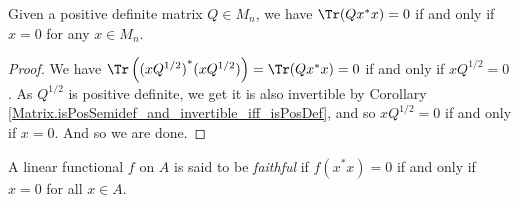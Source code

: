 \begin{lemma}\label{PosDef.trace_conjTranspose_mul_self_eq_zero_iff}\leanok
  Given a positive definite matrix $Q\in{M_n}$, we have $\Tr(Qx^*x)=0$ if and only if $x=0$ for any $x\in{M_n}$.
 \end{lemma}
 \begin{proof}\leanok
  We have $\Tr\left({(xQ^{1/2})}^*(xQ^{1/2})\right)=\Tr(Qx^*x)=0$ if and only if $xQ^{1/2}=0$. As $Q^{1/2}$ is positive definite, we get it is also invertible by Corollary \ref{Matrix.isPosSemidef_and_invertible_iff_isPosDef}, and so $xQ^{1/2}=0$ if and only if $x=0$. And so we are done.
 \end{proof}

  \begin{definition}\label{Dual.IsFaithful}\leanok
   A linear functional $f$ on $A$ is said to be \textit{faithful} if $f(x^*x)=0$ if and only if $x=0$ for all $x\in A$.
  \end{definition}

